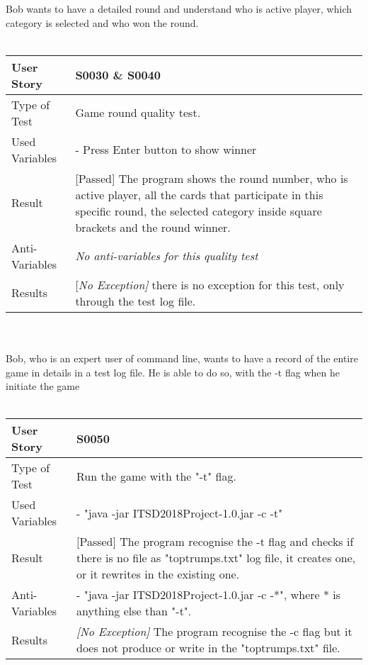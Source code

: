 Bob wants to have a detailed round and understand who is active player, which category is selected and who won the round.\\
\vspace{0.2cm}\\
\begin{tabular}{l | p{10cm}}
User Story & \textbf{S0030} \& \textbf{S0040} \\ \hline
Type of Test & Game round quality test.\\ \hline
Used Variables & - Press Enter button to show winner\\ \hline
Result & [Passed] The program shows the round number, who is active player, all the cards that participate in this specific round, the selected category inside square brackets and the round winner.\\ \hline
Anti-Variables & \textit{No anti-variables for this quality test} \\ \hline
Results & [\textit{No Exception]} there is no exception for this test, only through the test log file. \\ \hline
\end{tabular}\\
\vspace{0.8cm}\\
Bob, who is an expert user of command line, wants to have a record of the entire game in details in a test log file. He is able to do so, with the -t flag when he initiate the game\\
\vspace{0.2cm}\\
\begin{tabular}{l | p{10cm}}
User Story & \textbf{S0050}\\ \hline
Type of Test & Run the game with the "-t" flag.\\ \hline
Used Variables & - "java -jar ITSD2018Project-1.0.jar -c -t"\\ \hline
Result & [Passed] The program recognise the -t flag and checks if there is no file as "toptrumps.txt" log file, it creates one, or it rewrites in the existing one.\\ \hline
Anti-Variables & - "java -jar ITSD2018Project-1.0.jar -c -*", where * is anything else than "-t".\\ \hline
Results & \textit{[No Exception]} The program recognise the -c flag but it does not produce or write in the "toptrumps.txt" file. \\ \hline
\end{tabular}\\
